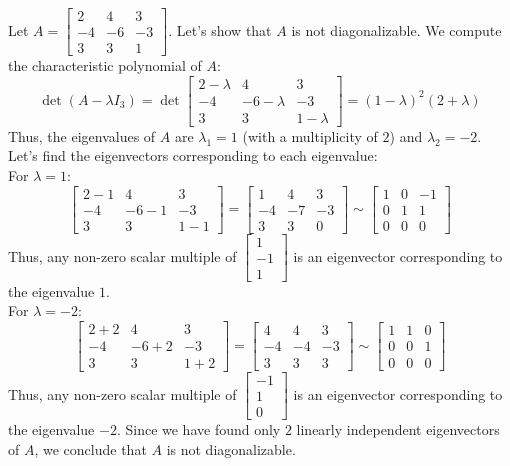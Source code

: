 \begin{eg}
    Let $A = \begin{bmatrix}
        2 & 4 & 3 \\ -4   & -6 & -3 \\ 3 & 3 & 1
    \end{bmatrix}$. Let's show that $A$ is not diagonalizable. We compute the characteristic polynomial of $A$:
    \[\det(A - \lambda I_3) = \det\begin{bmatrix}
        2 - \lambda & 4 & 3 \\ -4 & -6 - \lambda & -3 \\ 3 & 3 & 1 - \lambda
    \end{bmatrix} = (1 - \lambda)^2 ( 2 + \lambda )\]
    Thus, the eigenvalues of $A$ are $\lambda_1 = 1$ (with a multiplicity of $2$) and $\lambda_2 = -2$. Let's find the eigenvectors corresponding to each eigenvalue: \\
    For $\lambda = 1$:
    \[\begin{bmatrix}
        2 - 1 & 4 & 3 \\ -4 & -6 - 1 & -3 \\ 3 & 3 & 1 - 1
    \end{bmatrix} = \begin{bmatrix}
        1 & 4 & 3 \\ -4 & -7 & -3 \\ 3 & 3 & 0
    \end{bmatrix} \sim \begin{bmatrix}
        1 & 0 & -1 \\ 0 & 1 & 1 \\ 0 & 0 & 0
    \end{bmatrix}\]
    Thus, any non-zero scalar multiple of $\begin{bmatrix}
        1 \\ -1 \\ 1
    \end{bmatrix}$ is an eigenvector corresponding to the eigenvalue $1$. \\
    For $\lambda = -2$:
    \[\begin{bmatrix}
        2 + 2 & 4 & 3 \\ -4 & -6 + 2 & -3 \\ 3 & 3 & 1 + 2
    \end{bmatrix} = \begin{bmatrix}
        4 & 4 & 3 \\ -4 & -4 & -3 \\ 3 & 3 & 3
    \end{bmatrix} \sim \begin{bmatrix}
        1 & 1 & 0 \\ 0 & 0 & 1 \\ 0 & 0 & 0
    \end{bmatrix}\]
    Thus, any non-zero scalar multiple of $\begin{bmatrix}
        -1 \\ 1 \\ 0
    \end{bmatrix}$ is an eigenvector corresponding to the eigenvalue $-2$.
    Since we have found only $2$ linearly independent eigenvectors of $A$, we conclude that $A$ is not diagonalizable.
\end{eg}

